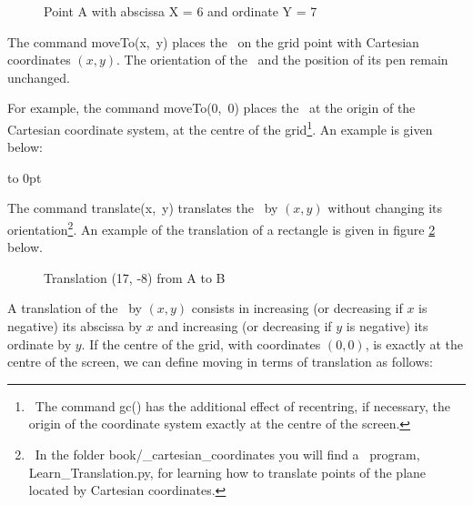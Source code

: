 \begin{figure}[htbp]
 \caption{Point A with abscissa X = 6 and ordinate Y = 7}
 \label{fig:coorA}
\end{figure}

The command {\idt moveTo(x,\ y)} places the \robot\ on the grid point with Cartesian coordinates $(x, y)$. 
The orientation of the \robot\ and the position of its pen remain unchanged. 

For example, the command {\idt moveTo(0,\ 0)} places the \robot\ at the origin of the Cartesian
coordinate system, at the centre of the grid\footnote{\ The command {\idt gc()} has the additional effect
of recentring, if necessary, the origin of the coordinate system exactly at the centre of the screen.}. 
An example is given below:

\clearpage
\vspace*{-1cm}
 {\raggedright 
 \vbox to 0pt{\vspace*{\baselineskip}\vspace*{6cm}%
 }%
 \label{prog:LigneDeCarres1}
 
 }

The command {\idt translate(x,\ y)} translates the \robot\ by $(x, y)$
without changing its orientation\footnote{\ In the folder {\idt book/\_cartesian\_coordinates} you will find
a \python\ program, {\idt Learn\_Translation.py}, for learning how to translate points of the plane 
located by Cartesian coordinates.}. An example of the translation of a rectangle is given in figure 
\ref{fig:extrans} below.
\begin{figure}[h]
%
 \caption{Translation (17, -8) from A to B}\label{fig:extrans}
\end{figure}
\newpage
A translation of the \robot\ by $(x, y)$ consists in increasing (or decreasing if $x$ is negative)
its abscissa by $x$ and increasing (or decreasing if $y$ is negative)
its ordinate by $y$. If the centre of the grid, with coordinates $(0, 0)$, is exactly at the centre
of the screen, we can define moving in terms of translation as follows:

{
\parindent {}
\medskip

\vspace{\neglskip}\mbox{}\par
\vspace{\neglskip}\mbox{\blc \blk{}}\par

\medskip }

